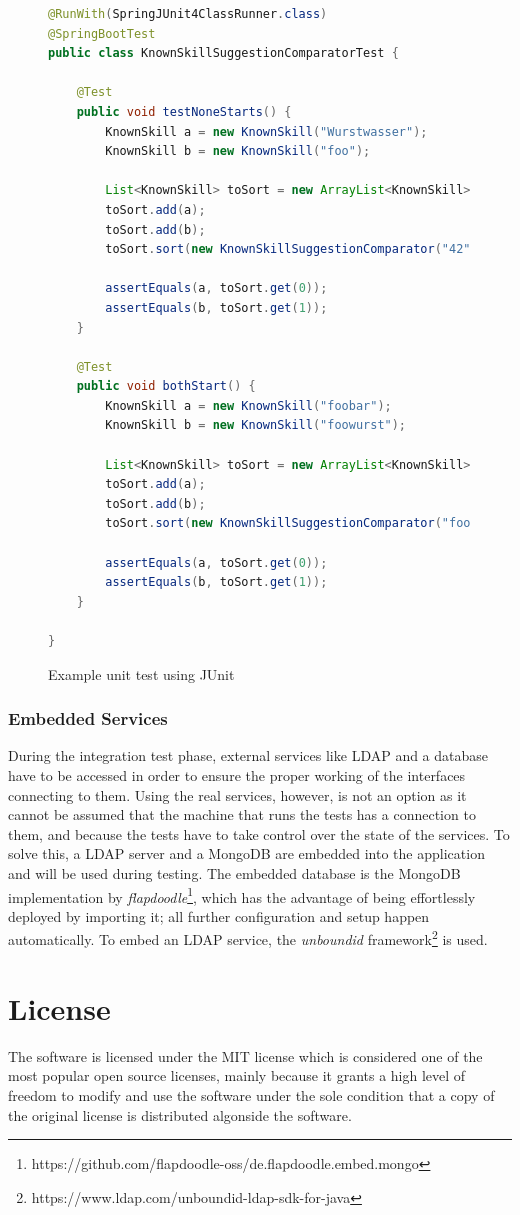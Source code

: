 \begin{figure}[h]
\begin{lstlisting}[language=Java]
@RunWith(SpringJUnit4ClassRunner.class)
@SpringBootTest
public class KnownSkillSuggestionComparatorTest {

	@Test
	public void testNoneStarts() {
		KnownSkill a = new KnownSkill("Wurstwasser");
		KnownSkill b = new KnownSkill("foo");

		List<KnownSkill> toSort = new ArrayList<KnownSkill>();
		toSort.add(a);
		toSort.add(b);
		toSort.sort(new KnownSkillSuggestionComparator("42"));

		assertEquals(a, toSort.get(0));
		assertEquals(b, toSort.get(1));
	}

	@Test
	public void bothStart() {
		KnownSkill a = new KnownSkill("foobar");
		KnownSkill b = new KnownSkill("foowurst");

		List<KnownSkill> toSort = new ArrayList<KnownSkill>();
		toSort.add(a);
		toSort.add(b);
		toSort.sort(new KnownSkillSuggestionComparator("foo"));

		assertEquals(a, toSort.get(0));
		assertEquals(b, toSort.get(1));
	}

}
\end{lstlisting}
\caption[Example Unit Test]{Example unit test using JUnit}
\end{figure}


\subsubsection{Embedded Services}
During the integration test phase, external services like LDAP and a database have to be accessed in order to ensure the proper working of the interfaces connecting to them. Using the real services, however, is not an option as it cannot be assumed that the machine that runs the tests has a connection to them, and because the tests have to take control over the state of the services. To solve this, a LDAP server and a MongoDB are embedded into the application and will be used during testing.
The embedded database is the MongoDB implementation by \textit{flapdoodle}\footnote{https://github.com/flapdoodle-oss/de.flapdoodle.embed.mongo}, which has the advantage of being effortlessly deployed by importing it; all further configuration and setup happen automatically.
To embed an LDAP service, the \textit{unboundid} framework\footnote{https://www.ldap.com/unboundid-ldap-sdk-for-java} is used.

\section{License}
The software is licensed under the MIT license \cite{license} which is considered one of the most popular open source licenses, mainly because it grants a high level of freedom to modify and use the software under the sole condition that a copy of the original license is distributed algonside the software.

